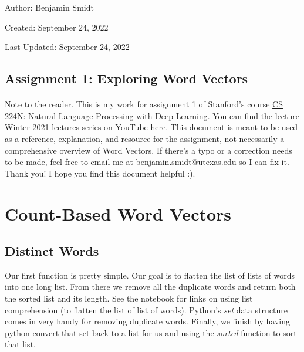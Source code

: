 \documentclass[12pt]{article}
\begin{document}
\noindent Author: Benjamin Smidt

\noindent Created: September 24, 2022

\noindent Last Updated: September 24, 2022
\begin{center}
\section*{Assignment 1: Exploring Word Vectors}
\end{center}

\paragraph{} Note to the reader. This is my work for assignment 1 of Stanford's course
\href{https://web.stanford.edu/class/cs224n/}{CS 224N: Natural Language Processing with Deep Learning}. 
You can find the lecture Winter 2021 lectures series on YouTube \href{https://www.youtube.com/playlist?list=PLoROMvodv4rOSH4v6133s9LFPRHjEmbmJ}{here}.
This document is meant to be used as a reference, explanation, and resource for the assignment, 
not necessarily a comprehensive overview of Word Vectors. If there's a typo or a correction 
needs to be made, feel free to email me at benjamin.smidt@utexas.edu so I can fix it. 
Thank you! I hope you find this document helpful :). 

\tableofcontents

\newpage

\section{Count-Based Word Vectors}

\subsection{Distinct Words}
Our first function is pretty simple. Our goal is to flatten the list of lists of words into one long list. 
From there we remove all the duplicate words and return both the sorted list and its length. See the
notebook for links on using list comprehension (to flatten the list of list of words). Python's \emph{set}
data structure comes in very handy for removing duplicate words. Finally, we finish by having python 
convert that set back to a list for us and using the \emph{sorted} function to sort that list. 
\end{document}
